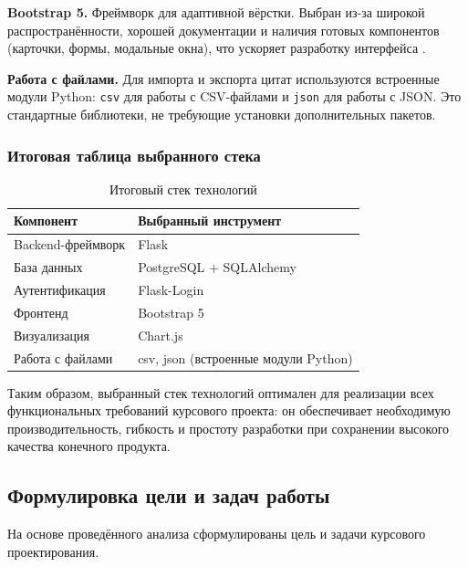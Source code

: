 \textbf{Bootstrap 5.} Фреймворк для адаптивной вёрстки. Выбран из-за широкой распространённости, 
хорошей документации и наличия готовых компонентов (карточки, формы, модальные окна), 
что ускоряет разработку интерфейса \cite{bootstrap_docs}. 

\textbf{Работа с файлами.} Для импорта и экспорта цитат используются встроенные модули 
Python: \texttt{csv} для работы с CSV-файлами и \texttt{json} для работы с JSON. Это 
стандартные библиотеки, не требующие установки дополнительных пакетов.

\subsubsection{Итоговая таблица выбранного стека}

\begin{table}[ht!]
    \centering
    \caption{Итоговый стек технологий}
    \label{tab:stack}
    \begin{tabular}{|p{}|p{}|}
        \hline
        \textbf{Компонент} & \textbf{Выбранный инструмент}        \\ \hline
        Backend-фреймворк  & Flask                                \\ \hline
        База данных        & PostgreSQL + SQLAlchemy              \\ \hline
        Аутентификация     & Flask-Login                          \\ \hline
        Фронтенд           & Bootstrap 5                          \\ \hline
        Визуализация       & Chart.js                             \\ \hline
        Работа с файлами   & csv, json (встроенные модули Python) \\ \hline
    \end{tabular}
\end{table}

Таким образом, выбранный стек технологий оптимален для реализации всех функциональных 
требований курсового проекта: он обеспечивает необходимую производительность, гибкость и 
простоту разработки при сохранении высокого качества конечного продукта.

\subsection{Формулировка цели и задач работы}

На основе проведённого анализа сформулированы цель и задачи курсового проектирования.

